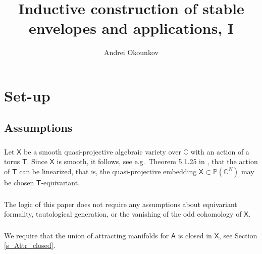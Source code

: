 \documentclass[14pt]{extarticle}
\newcommand{\C}{\mathbb{C}}
\newcommand{\bT}{\mathsf{T}}
\newcommand{\bA}{\mathsf{A}}
\newcommand{\bX}{\mathsf{X}}
\newcommand{\bP}{\mathbb{P}}
\theoremstyle{definition}
\begin{document}
\title{Inductive construction of stable envelopes and applications, I} 
\author{Andrei Okounkov} 
\date{}
\maketitle




\setcounter{tocdepth}{2}
\tableofcontents

\section{Set-up} 

\subsection{Assumptions}

\subsubsection{} \label{s_quasiprojective_X}

Let $\bX$ be a smooth quasi-projective algebraic variety over $\C$ with an action of
a torus $\bT$.  Since $\bX$ is smooth, it follows, see e.g.\ Theorem
5.1.25 in \cite{CG}, that the action of
$\bT$ can be linearized, that is, the quasi-projective embedding
$\bX\subset \bP(\C^N)$ may be chosen $\bT$-equivariant. 





\subsubsection{}

The logic of this paper does not require any assumptions about
equivariant formality, tautological generation, or the vanishing of
the odd cohomology of $\bX$.

\subsubsection{}\label{s_assume_Attr}


We require that the union of attracting manifolds for $\bA$ is closed
in $\bX$, see Section \ref{s_Attr_closed}. 
\end{document}

